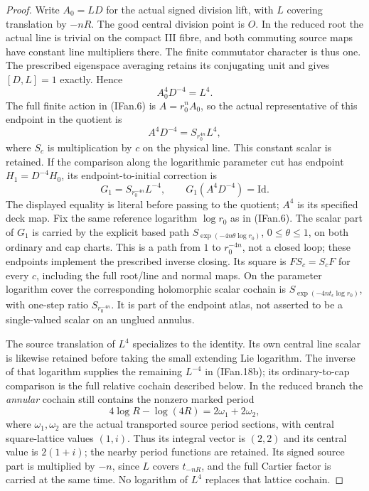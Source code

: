 \begin{proof}
Write \(A_0=L D\) for the actual signed division lift, with \(L\)
covering translation by \(-nR\). The good
central division point is \(O\). In the reduced root the actual line
is trivial on the compact III fibre, and both commuting source maps
have constant line multipliers there. The finite commutator character
is thus one. The prescribed eigenspace averaging retains its
conjugating unit and gives \([D,L]=1\) exactly. Hence
\[
 A_0^4D^{-4}=L^4.                                  \tag{IFan.18}
\]
The full finite action in (IFan.6) is \(A=r_0^n A_0\), so the
actual representative of this endpoint in the quotient is
\[
 A^4D^{-4}=S_{r_0^{4n}}L^4,                         \tag{IFan.18a}
\]
where \(S_c\) is multiplication by \(c\) on the physical line. This
constant scalar is retained. If the comparison along the logarithmic
parameter cut has endpoint \(H_1=D^{-4}H_0\), its endpoint-to-initial
correction is
\[
 G_1=S_{r_0^{-4n}}L^{-4},\qquad
 G_1(A^4D^{-4})=\mathrm{Id}.                        \tag{IFan.18b}
\]
The displayed equality is literal before passing to the quotient;
\(A^4\) is its specified deck map. Fix the same reference logarithm
\(\log r_0\) as in (IFan.6). The scalar part of \(G_1\) is carried
by the explicit based path \(S_{\exp(-4n\theta\log r_0)}\),
\(0\le\theta\le1\), on both ordinary and cap charts. This is a path
from \(1\) to \(r_0^{-4n}\), not a closed loop; these endpoints
implement the prescribed inverse closing. Its square is
\(F S_c=S_c F\) for every \(c\), including the full root/line and
normal maps. On the parameter logarithm cover the corresponding
holomorphic scalar cochain is
\(S_{\exp(-4n t_\epsilon\log r_0)}\), with one-step ratio
\(S_{r_0^{-4n}}\). It is part of the endpoint atlas, not asserted to
be a single-valued scalar on an unglued annulus.

The source translation of \(L^4\) specializes to the identity. Its
own central line scalar is likewise retained before taking the small
extending Lie logarithm. The inverse of that logarithm supplies the
remaining \(L^{-4}\) in (IFan.18b); its ordinary-to-cap comparison
is the full relative cochain described below. In the reduced branch the \emph{annular} cochain still
contains the nonzero marked period
\[
 4\log R-\log(4R)=2\omega_1+2\omega_2,              \tag{IFan.19}
\]
where \(\omega_1,\omega_2\) are the actual transported source period
sections, with central square-lattice values \((1,i)\). Thus its
integral vector is \((2,2)\) and its central value is \(2(1+i)\);
the nearby period functions are retained. Its signed source part is
multiplied by \(-n\), since \(L\) covers \(t_{-nR}\), and the full Cartier factor is
carried at the same time. No logarithm of \(L^4\)
replaces that lattice cochain.


\end{proof}

